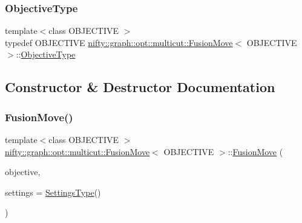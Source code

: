 \mbox{\label{classnifty_1_1graph_1_1opt_1_1multicut_1_1FusionMove_ab700a686e5eff05008757b9a2b707111}} 
\subsubsection{\texorpdfstring{Objective\+Type}{ObjectiveType}}
{\footnotesize\ttfamily template$<$class O\+B\+J\+E\+C\+T\+I\+VE $>$ \\
typedef O\+B\+J\+E\+C\+T\+I\+VE \hyperlink{classnifty_1_1graph_1_1opt_1_1multicut_1_1FusionMove}{nifty\+::graph\+::opt\+::multicut\+::\+Fusion\+Move}$<$ O\+B\+J\+E\+C\+T\+I\+VE $>$\+::\hyperlink{classnifty_1_1graph_1_1opt_1_1multicut_1_1FusionMove_ab700a686e5eff05008757b9a2b707111}{Objective\+Type}}



\subsection{Constructor \& Destructor Documentation}
\mbox{\label{classnifty_1_1graph_1_1opt_1_1multicut_1_1FusionMove_a2f7fd8e8cbf6f20d2ef0f136ea35b71c}} 
\subsubsection{\texorpdfstring{Fusion\+Move()}{FusionMove()}}
{\footnotesize\ttfamily template$<$class O\+B\+J\+E\+C\+T\+I\+VE $>$ \\
\hyperlink{classnifty_1_1graph_1_1opt_1_1multicut_1_1FusionMove}{nifty\+::graph\+::opt\+::multicut\+::\+Fusion\+Move}$<$ O\+B\+J\+E\+C\+T\+I\+VE $>$\+::\hyperlink{classnifty_1_1graph_1_1opt_1_1multicut_1_1FusionMove}{Fusion\+Move} (\begin{DoxyParamCaption}\item[{const \hyperlink{classnifty_1_1graph_1_1opt_1_1multicut_1_1FusionMove_ab700a686e5eff05008757b9a2b707111}{Objective\+Type} \&}]{objective,  }\item[{const \hyperlink{structnifty_1_1graph_1_1opt_1_1multicut_1_1FusionMove_1_1SettingsType}{Settings\+Type} \&}]{settings = {\ttfamily \hyperlink{structnifty_1_1graph_1_1opt_1_1multicut_1_1FusionMove_1_1SettingsType}{Settings\+Type}()} }\end{DoxyParamCaption})\hspace{0.3cm}{\ttfamily [inline]}}



